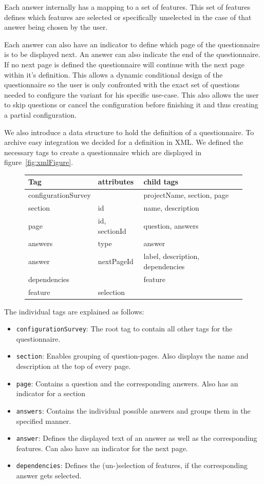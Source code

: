 Each answer internally has a mapping to a set of features. This set of features defines which features are selected or specifically unselected in the case of that answer being chosen by the user.

Each answer can also have an indicator to define which page of the questionnaire is to be displayed next. An answer can also indicate the end of the questionnaire. If no next page is defined the questionnaire will continue with the next page within it's definition. This allows a dynamic conditional design of the questionnaire so the user is only confronted with the exact set of questions needed to configure the variant for his specific use-case. This also allows the user to skip questions or cancel the configuration before finishing it and thus creating a partial configuration.

We also introduce a data structure to hold the definition of a questionnaire. To archive easy integration we decided for a definition in XML. We defined the necessary tags to create a questionnaire which are displayed in figure~\ref{fig:xmlFigure}.

\begin{figure}[H]
\begin{tabulary}{\linewidth}{LLL}
\textbf{Tag} & \textbf{attributes} & \textbf{child tags}\\
\hline
configurationSurvey & & projectName, section, page\\
section & id & name, description\\
page & id, sectionId & question, answers\\
answers & type & answer\\
answer & nextPageId & label, description, dependencies\\
dependencies & & feature\\
feature & selection & \\
\end{tabulary}\vspace{2.5em}
\end{figure}

The individual tags are explained as follows:
\begin{itemize}
\item \texttt{configurationSurvey}: The root tag to contain all other tags for the questionnaire.
\item \texttt{section}: Enables grouping of question-pages. Also displays the name and description at the top of every page.
\item \texttt{page}: Contains a question and the corresponding answers. Also has an indicator for a section
\item \texttt{answers}: Contains the individual possible answers and groups them in the specified manner.
\item \texttt{answer}: Defines the displayed text of an answer as well as the corresponding features. Can also have an indicator for the next page.
\item \texttt{dependencies}: Defines the (un-)selection of features, if the corresponding answer gets selected.
\end{itemize}

